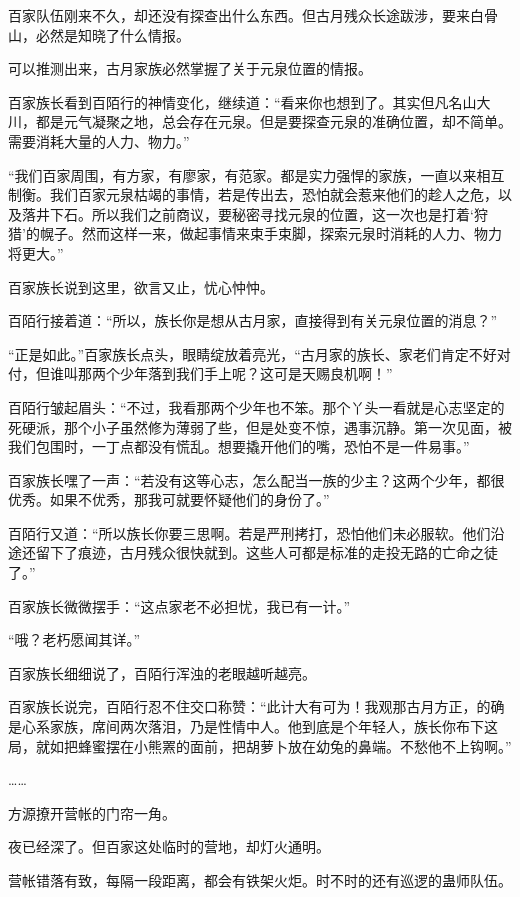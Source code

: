 \begin{this_body}
百家队伍刚来不久，却还没有探查出什么东西。但古月残众长途跋涉，要来白骨山，必然是知晓了什么情报。

可以推测出来，古月家族必然掌握了关于元泉位置的情报。

百家族长看到百陌行的神情变化，继续道：“看来你也想到了。其实但凡名山大川，都是元气凝聚之地，总会存在元泉。但是要探查元泉的准确位置，却不简单。需要消耗大量的人力、物力。”

“我们百家周围，有方家，有廖家，有范家。都是实力强悍的家族，一直以来相互制衡。我们百家元泉枯竭的事情，若是传出去，恐怕就会惹来他们的趁人之危，以及落井下石。所以我们之前商议，要秘密寻找元泉的位置，这一次也是打着‘狩猎’的幌子。然而这样一来，做起事情来束手束脚，探索元泉时消耗的人力、物力将更大。”

百家族长说到这里，欲言又止，忧心忡忡。

百陌行接着道：“所以，族长你是想从古月家，直接得到有关元泉位置的消息？”

“正是如此。”百家族长点头，眼睛绽放着亮光，“古月家的族长、家老们肯定不好对付，但谁叫那两个少年落到我们手上呢？这可是天赐良机啊！”

百陌行皱起眉头：“不过，我看那两个少年也不笨。那个丫头一看就是心志坚定的死硬派，那个小子虽然修为薄弱了些，但是处变不惊，遇事沉静。第一次见面，被我们包围时，一丁点都没有慌乱。想要撬开他们的嘴，恐怕不是一件易事。”

百家族长嘿了一声：“若没有这等心志，怎么配当一族的少主？这两个少年，都很优秀。如果不优秀，那我可就要怀疑他们的身份了。”

百陌行又道：“所以族长你要三思啊。若是严刑拷打，恐怕他们未必服软。他们沿途还留下了痕迹，古月残众很快就到。这些人可都是标准的走投无路的亡命之徒了。”

百家族长微微摆手：“这点家老不必担忧，我已有一计。”

“哦？老朽愿闻其详。”

百家族长细细说了，百陌行浑浊的老眼越听越亮。

百家族长说完，百陌行忍不住交口称赞：“此计大有可为！我观那古月方正，的确是心系家族，席间两次落泪，乃是性情中人。他到底是个年轻人，族长你布下这局，就如把蜂蜜摆在小熊罴的面前，把胡萝卜放在幼兔的鼻端。不愁他不上钩啊。”

……

方源撩开营帐的门帘一角。

夜已经深了。但百家这处临时的营地，却灯火通明。

营帐错落有致，每隔一段距离，都会有铁架火炬。时不时的还有巡逻的蛊师队伍。


\end{this_body}
